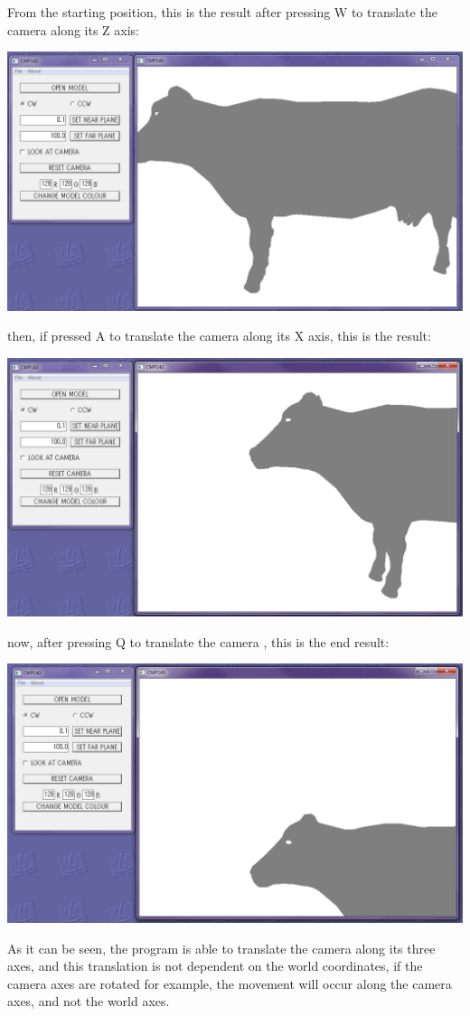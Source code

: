 \documentclass[12pt]{article}
\begin{document}
\begin{itemize}
From the starting position, this is the result after pressing W to translate the camera along its Z axis:
\begin{center}
	\includegraphics[scale=0.5]{4.png}
\end{center}
then, if pressed A to translate the camera along its X axis, this is the result:
\begin{center}
	\includegraphics[scale=0.5]{5.png}
\end{center}
now, after pressing Q to translate the camera , this is the end result:
\begin{center}
	\includegraphics[scale=0.5]{6.png}
\end{center}
As it can be seen, the program is able to translate the camera along its three axes, and this translation is not dependent on the world coordinates, if the camera axes are rotated for example, the movement will occur along the camera axes, and not the world axes.


\end{itemize}
\end{document}
